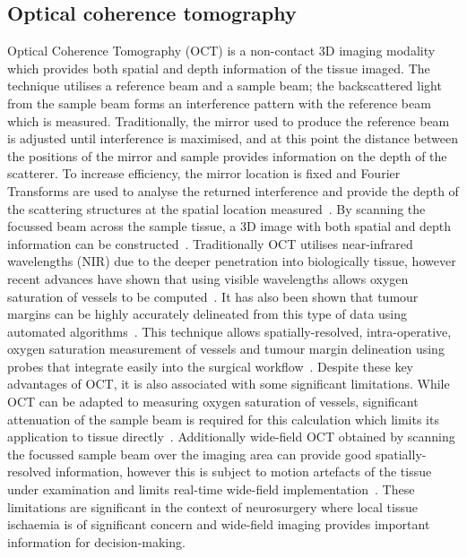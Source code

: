 \subsection{Optical coherence tomography}
Optical Coherence Tomography (OCT) is a non-contact 3D imaging modality which provides both spatial and depth information of the tissue imaged. The technique utilises a reference beam and a sample beam; the backscattered light from the sample beam forms an interference pattern with the reference beam which is measured. Traditionally, the mirror used to produce the reference beam is adjusted until interference is maximised, and at this point the distance between the positions of the mirror and sample provides information on the depth of the scatterer. To increase efficiency, the mirror location is fixed and Fourier Transforms are used to analyse the returned interference and provide the depth of the scattering structures at the spatial location measured~\citep{Fercher2003}. By scanning the focussed beam across the sample tissue, a 3D image with both spatial and depth information can be constructed~\citep{Fercher2003}. Traditionally OCT utilises near-infrared wavelengths (NIR) due to the deeper penetration into biologically tissue, however recent advances have shown that using visible wavelengths allows oxygen saturation of vessels to be computed~\citep{Shu2017}. It has also been shown that tumour margins can be highly accurately delineated from this type of data using automated algorithms~\citep{Sunny2019}. 
This technique allows spatially-resolved, intra-operative, oxygen saturation measurement of vessels and tumour margin delineation using probes that integrate easily into the surgical workflow~\citep{Jansen2018}. Despite these key advantages of OCT, it is also associated with some significant limitations. While OCT can be adapted to measuring oxygen saturation of vessels, significant attenuation of the sample beam is required for this calculation which limits its application to tissue directly~\citep{Shu2017}. Additionally wide-field OCT obtained by scanning the focussed sample beam over the imaging area can provide good spatially-resolved information, however this is subject to motion artefacts of the tissue under examination and limits real-time wide-field implementation~\citep{Yu2015}. These limitations are significant in the context of neurosurgery where local tissue ischaemia is of significant concern and wide-field imaging provides important information for decision-making. 

